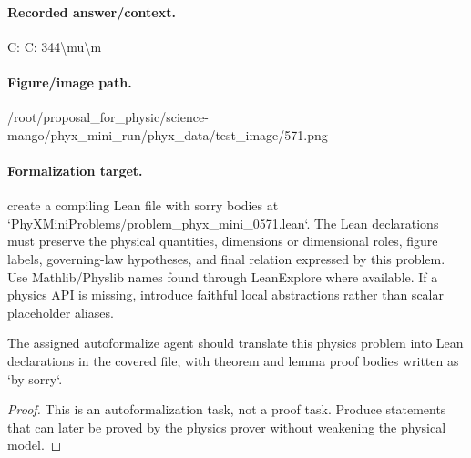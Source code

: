 \paragraph{Recorded answer/context.}
C: C: 344\textbackslash{}mu\textbackslash{}m

\paragraph{Figure/image path.}
/root/proposal\_for\_physic/science-mango/phyx\_mini\_run/phyx\_data/test\_image/571.png

\paragraph{Formalization target.}
create a compiling Lean file with sorry bodies at `PhyXMiniProblems/problem\_phyx\_mini\_0571.lean`. The Lean declarations must preserve the physical quantities, dimensions or dimensional roles, figure labels, governing-law hypotheses, and final relation expressed by this problem.
Use Mathlib/Physlib names found through LeanExplore where available. If a physics API is missing, introduce faithful local abstractions rather than scalar placeholder aliases.

\begin{theorem}
\label{thm:physics:phyx_mini_0571:target}
The assigned autoformalize agent should translate this physics problem into Lean declarations in the covered file, with theorem and lemma proof bodies written as `by sorry`.
\end{theorem}
\begin{proof}
This is an autoformalization task, not a proof task. Produce statements that can later be proved by the physics prover without weakening the physical model.
\end{proof}

